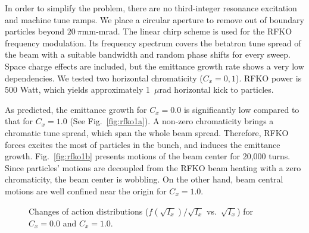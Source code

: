 \documentclass[aps,prstab,onecolumn,preprint]{revtex4-1}
\begin{document}
In order to simplify the problem, there are no third-integer resonance excitation and machine tune ramps. We place a circular aperture to remove out of boundary particles beyond $20~\pi$mm-mrad. The linear chirp scheme is used for the RFKO frequency modulation. Its frequency spectrum covers the betatron tune spread of the beam with a suitable bandwidth and random phase shifts for every sweep. Space charge effects are included, but the emittance growth rate shows a very low dependencies. We tested two horizontal chromaticity ($C_{x} = 0,1$). RFKO power is 500 Watt, which yields approximately 1~$\mu$rad horizontal kick to particles. 

As predicted, the emittance growth for $C_{x}=0.0$ is significantly low compared to that for $C_{x}=1.0$ (See Fig.~\ref{fig:rfko1a}). A non-zero chromaticity brings a chromatic tune spread, which span the whole beam spread. Therefore, RFKO forces excites the most of particles in the bunch, and induces the emittance growth. Fig.~\ref{fig:rfko1b} presents motions of the beam center for 20,000 turns. Since particles' motions are decoupled from the RFKO beam heating with a zero chromaticity, the beam center is wobbling. On the other hand, beam central motions are well confined near the origin for $C_{x}=1.0$.

\begin{figure}[!tbp]
  \caption{\label{fig:rfko2}Changes of action distributions ($f(\sqrt{I_{x}}) / \sqrt{I_{x}}$ vs.~$\sqrt{I_{x}}$) for $C_{x} = 0.0$ and $C_{x} = 1.0$.}
\end{figure}
\end{document}
